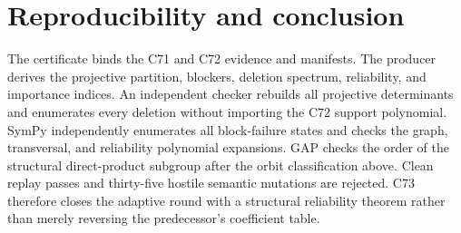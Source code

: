 \documentclass[10pt]{article}
\begin{document}
\section{Reproducibility and conclusion}
The certificate binds the C71 and C72 evidence and manifests.  The producer
derives the projective partition, blockers, deletion spectrum, reliability,
and importance indices.  An independent checker rebuilds all projective
determinants and enumerates every deletion without importing the C72 support
polynomial.  SymPy independently enumerates all block-failure states and
checks the graph, transversal, and reliability polynomial expansions.  GAP
checks the order of the structural direct-product subgroup after the orbit
classification above.  Clean replay passes and
thirty-five hostile semantic mutations are rejected.  C73 therefore closes
the adaptive round with a structural reliability theorem rather than merely
reversing the predecessor's coefficient table.
\end{document}
